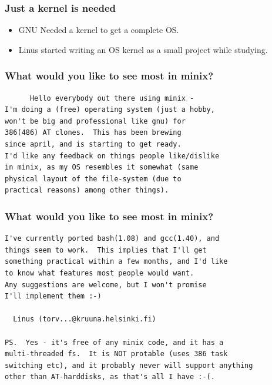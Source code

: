 \documentclass[hyperref={pdfpagelabels=false},xcolor=pst,pdf,fragile]{beamer}
\begin{document}
\begin{frame}
  \frametitle{Just a kernel is needed}

  \begin{itemize}
	  \item GNU Needed a kernel to get a complete OS.
	  \item Linus started writing an OS kernel as a small project while
		  studying.
  \end{itemize}

\end{frame}

\begin{frame}[fragile]
  \frametitle{What would you like to see most in minix?}

  \begin{lstlisting}
	  Hello everybody out there using minix -
I'm doing a (free) operating system (just a hobby,
won't be big and professional like gnu) for
386(486) AT clones.  This has been brewing
since april, and is starting to get ready.
I'd like any feedback on things people like/dislike
in minix, as my OS resembles it somewhat (same
physical layout of the file-system (due to
practical reasons) among other things).

  \end{lstlisting}

\end{frame}

\begin{frame}[fragile]
  \frametitle{What would you like to see most in minix?}

  \begin{lstlisting}
I've currently ported bash(1.08) and gcc(1.40), and
things seem to work.  This implies that I'll get
something practical within a few months, and I'd like
to know what features most people would want.
Any suggestions are welcome, but I won't promise
I'll implement them :-)

  Linus (torv...@kruuna.helsinki.fi)

PS.  Yes - it's free of any minix code, and it has a
multi-threaded fs.  It is NOT protable (uses 386 task
switching etc), and it probably never will support anything
other than AT-harddisks, as that's all I have :-(. 
  \end{lstlisting}

\end{frame}
\end{document}
